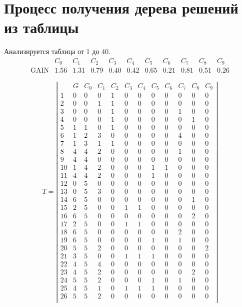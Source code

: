 \section{Процесс получения дерева решений из таблицы}

Анализируется таблица от 1 до 40.
$$ 
\begin{array}{l|c|ccccccccc}
	  & C_{0} & C_{1} & C_{2} & C_{3} & C_{4} & C_{5} & C_{6} & C_{7} & C_{8} & C_{9}\\
 \textrm{GAIN} & 1.56 & 1.31 & 0.79 & 0.40 & 0.42 & 0.65 & 0.21 & 0.81 & 0.51 & 0.26
\end{array}
 $$

$$
T = \left| \begin{array}{lc|c|ccccccccc}
	 & G & C_{0} & C_{1} & C_{2} & C_{3} & C_{4} & C_{5} & C_{6} & C_{7} & C_{8} & C_{9}\\
	1 & 0 & 0 & 0 & 1 & 0 & 0 & 0 & 0 & 0 & 0 & 0\\
	2 & 0 & 0 & 1 & 1 & 0 & 0 & 0 & 0 & 0 & 0 & 0\\
	3 & 0 & 0 & 0 & 1 & 0 & 0 & 0 & 0 & 1 & 0 & 0\\
	4 & 0 & 0 & 0 & 1 & 0 & 0 & 0 & 0 & 0 & 1 & 0\\
	5 & 1 & 1 & 0 & 1 & 0 & 0 & 0 & 0 & 0 & 0 & 0\\
	6 & 1 & 2 & 3 & 0 & 0 & 0 & 0 & 0 & 4 & 0 & 0\\
	7 & 1 & 3 & 1 & 1 & 0 & 0 & 0 & 0 & 0 & 0 & 0\\
	8 & 4 & 4 & 2 & 0 & 0 & 0 & 0 & 0 & 1 & 0 & 0\\
	9 & 4 & 4 & 0 & 0 & 0 & 0 & 0 & 0 & 0 & 0 & 0\\
	10 & 1 & 4 & 2 & 0 & 0 & 0 & 1 & 1 & 0 & 0 & 0\\
	11 & 4 & 4 & 2 & 0 & 0 & 0 & 1 & 0 & 0 & 0 & 0\\
	12 & 0 & 5 & 0 & 0 & 0 & 0 & 0 & 0 & 0 & 0 & 0\\
	13 & 0 & 5 & 3 & 0 & 0 & 0 & 0 & 0 & 0 & 0 & 0\\
	14 & 6 & 5 & 0 & 0 & 0 & 0 & 0 & 0 & 0 & 1 & 0\\
	15 & 2 & 5 & 0 & 0 & 1 & 1 & 0 & 0 & 0 & 0 & 0\\
	16 & 6 & 5 & 0 & 0 & 0 & 0 & 0 & 0 & 0 & 2 & 0\\
	17 & 2 & 5 & 0 & 0 & 1 & 1 & 0 & 0 & 0 & 0 & 0\\
	18 & 6 & 5 & 0 & 0 & 0 & 0 & 0 & 0 & 2 & 0 & 0\\
	19 & 6 & 5 & 0 & 0 & 0 & 0 & 1 & 0 & 1 & 0 & 0\\
	20 & 5 & 5 & 2 & 0 & 0 & 0 & 0 & 0 & 0 & 0 & 2\\
	21 & 3 & 5 & 0 & 0 & 1 & 1 & 1 & 0 & 0 & 0 & 0\\
	22 & 4 & 5 & 4 & 0 & 0 & 0 & 0 & 0 & 0 & 0 & 0\\
	23 & 4 & 5 & 2 & 0 & 0 & 0 & 0 & 0 & 0 & 2 & 0\\
	24 & 5 & 5 & 2 & 0 & 0 & 0 & 1 & 0 & 1 & 0 & 0\\
	25 & 4 & 5 & 1 & 0 & 1 & 1 & 1 & 0 & 0 & 0 & 0\\
	26 & 5 & 5 & 2 & 0 & 0 & 0 & 0 & 0 & 0 & 0 & 0\\
\end{array} \right|
$$

